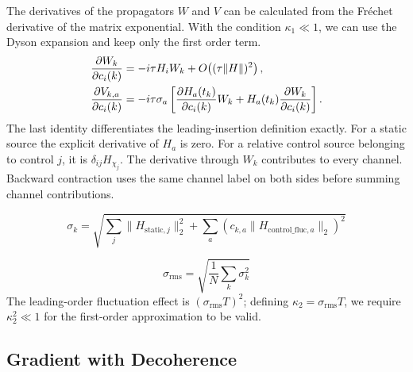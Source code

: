 \documentclass{simple-notes}
\begin{document}
The derivatives of the propagators $W$ and $V$ can be calculated from the Fr\'echet derivative of the matrix exponential. With the condition $\kappa_1\ll 1$, we can use the Dyson expansion and keep only the first order term.
\begin{align}
    \pdv{W_k}{c_i(k)}
    &=
    -i\tau H_i W_k
    + O\!\left((\tau\norm{H})^2\right),
    \\
    \pdv{V_{k,a}}{c_i(k)}
    &= -i\tau\sigma_a\left[
    \pdv{H_a(t_k)}{c_i(k)}W_k+
    H_a(t_k)\pdv{W_k}{c_i(k)}\right].
\end{align}
The last identity differentiates the leading-insertion definition exactly.
For a static source the explicit derivative of $H_a$ is zero. For a relative
control source belonging to control $j$, it is $\delta_{ij}H_{\chi_j}$.
The derivative through $W_k$ contributes to every channel. Backward contraction
uses the same channel label on both sides before summing channel contributions.

\[\sigma_k=\sqrt{\sum_j \|H_{\mathrm{static},j}\|_2^2+\sum_a\left(
c_{k,a}\|H_{\mathrm{control\_fluc},a}\|_2
\right)^2}
\]


\[
\sigma_{\mathrm{rms}}
=
\sqrt{
\frac{1}{N}
\sum_k \sigma_k^2
}
\]
The leading-order fluctuation effect is $(\sigma_{\mathrm{rms}}T)^2$; defining $\kappa_2 = \sigma_{\mathrm{rms}}T$, we require $\kappa_2^2 \ll 1$ for the first-order approximation to be valid.


\subsection{Gradient with Decoherence}
\end{document}
